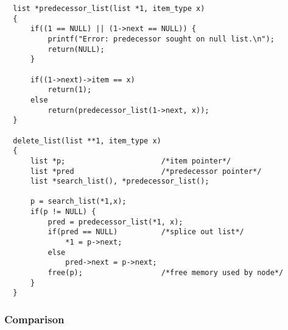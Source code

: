 \begin{verbatim}
  list *predecessor_list(list *1, item_type x)
  {
      if((1 == NULL) || (1->next == NULL)) {
          printf("Error: predecessor sought on null list.\n");
          return(NULL);
      }

      if((1->next)->item == x)
          return(1);
      else
          return(predecessor_list(1->next, x));
  }

  delete_list(list **1, item_type x)
  {
      list *p;                      /*item pointer*/
      list *pred                    /*predecessor pointer*/
      list *search_list(), *predecessor_list();

      p = search_list(*1,x);
      if(p != NULL) {
          pred = predecessor_list(*1, x);
          if(pred == NULL)          /*splice out list*/
              *1 = p->next;
          else
              pred->next = p->next;
          free(p);                  /*free memory used by node*/
      }
  }
\end{verbatim}

\subsubsection{Comparison}

\noindent{}